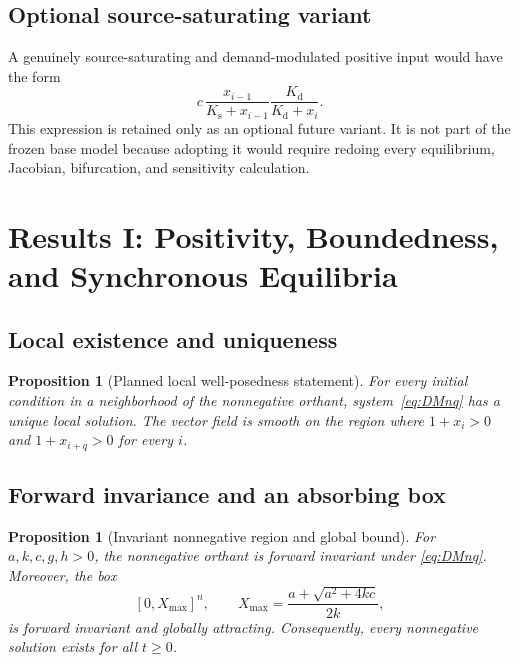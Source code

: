 \documentclass[11pt, reqno]{amsart}
\newtheorem{proposition}[theorem]{Proposition}
\theoremstyle{definition}
\theoremstyle{remark}
\begin{document}
	\subsection{Optional source-saturating variant}
	
	A genuinely source-saturating and demand-modulated positive input would have
	the form
	\begin{equation}
		\label{eq:true-saturation-candidate}
		c\,
		\frac{x_{i-1}}{K_{\mathrm s}+x_{i-1}}
		\frac{K_{\mathrm d}}{K_{\mathrm d}+x_i}.
	\end{equation}
	This expression is retained only as an optional future variant.  It is not part
	of the frozen base model because adopting it would require redoing every
	equilibrium, Jacobian, bifurcation, and sensitivity calculation.
	
	
	\section{Results I: Positivity, Boundedness, and Synchronous Equilibria}
	\label{sec:global}
	
	\subsection{Local existence and uniqueness}
	
	\begin{proposition}[Planned local well-posedness statement]
		For every initial condition in a neighborhood of the nonnegative orthant,
		system~\eqref{eq:DMnq} has a unique local solution.  The vector field is smooth
		on the region where $1+x_i>0$ and $1+x_{i+q}>0$ for every $i$.
	\end{proposition}
	
	
	\subsection{Forward invariance and an absorbing box}
	
	\begin{proposition}[Invariant nonnegative region and global bound]
		\label{prop:absorbing-box}
		For $a,k,c,g,h>0$, the nonnegative orthant is forward invariant under
		\eqref{eq:DMnq}.  Moreover, the box
		\[
		[0,X_{\max}]^n,
		\qquad
		X_{\max}=\frac{a+\sqrt{a^2+4kc}}{2k},
		\]
		is forward invariant and globally attracting.  Consequently, every
		nonnegative solution exists for all $t\ge0$.
	\end{proposition}
	
\end{document}
